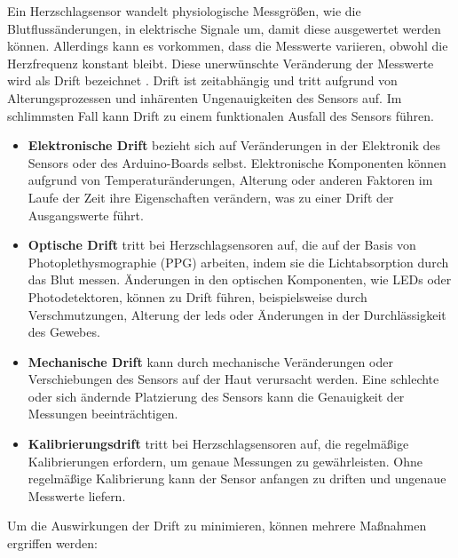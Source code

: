 {    Ein Herzschlagsensor wandelt physiologische Messgrößen, wie die Blutflussänderungen, in elektrische Signale um, damit diese ausgewertet werden können. Allerdings kann es vorkommen, dass die Messwerte variieren, obwohl die Herzfrequenz konstant bleibt. Diese unerwünschte Veränderung der Messwerte wird als Drift bezeichnet \cite{Traenkler:2014}. Drift ist zeitabhängig und tritt aufgrund von Alterungsprozessen und inhärenten Ungenauigkeiten des Sensors auf. Im schlimmsten Fall kann Drift zu einem funktionalen Ausfall des Sensors führen.
    
    \begin{itemize}[label={}]
        \item  \textbf{Elektronische Drift} bezieht sich auf Veränderungen in der Elektronik des Sensors oder des Arduino-Boards selbst. Elektronische Komponenten können aufgrund von Temperaturänderungen, Alterung oder anderen Faktoren im Laufe der Zeit ihre Eigenschaften verändern, was zu einer Drift der Ausgangswerte führt.
        \item  \textbf{Optische Drift} tritt bei Herzschlagsensoren auf, die auf der Basis von Photoplethysmographie (PPG) arbeiten, indem sie die Lichtabsorption durch das Blut messen. Änderungen in den optischen Komponenten, wie LEDs oder Photodetektoren, können zu Drift führen, beispielsweise durch Verschmutzungen, Alterung der \ac{led}s oder Änderungen in der Durchlässigkeit des Gewebes.
        \item  \textbf{Mechanische Drift} kann durch mechanische Veränderungen oder Verschiebungen des Sensors auf der Haut verursacht werden. Eine schlechte oder sich ändernde Platzierung des Sensors kann die Genauigkeit der Messungen beeinträchtigen.
        \item  \textbf{Kalibrierungsdrift} tritt bei Herzschlagsensoren auf, die regelmäßige Kalibrierungen erfordern, um genaue Messungen zu gewährleisten. Ohne regelmäßige Kalibrierung kann der Sensor anfangen zu driften und ungenaue Messwerte liefern.
    \end{itemize}

    Um die Auswirkungen der Drift zu minimieren, können mehrere Maßnahmen ergriffen werden:
    
}
